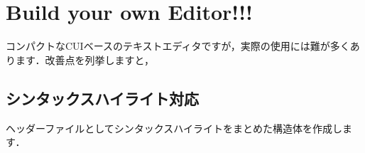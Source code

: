  \inputminted[frame=lines,framesep=2mm,baselinestretch=1.2,fontsize=\footnotesize,linenos,breaklines]{c}{takuzoo3868asset/struct.c}

 \inputminted[frame=lines,framesep=2mm,baselinestretch=1.2,fontsize=\footnotesize,linenos,breaklines]{c}{takuzoo3868asset/initEditor.c}

 \inputminted[frame=lines,framesep=2mm,baselinestretch=1.2,fontsize=\footnotesize,linenos,breaklines]{c}{takuzoo3868asset/editorSelectSyntaxHighlight.c}

 \inputminted[frame=lines,framesep=2mm,baselinestretch=1.2,fontsize=\footnotesize,linenos,breaklines]{c}{takuzoo3868asset/editorOpen.c}

 \inputminted[frame=lines,framesep=2mm,baselinestretch=1.2,fontsize=\footnotesize,linenos,breaklines]{c}{takuzoo3868asset/enableRawMode.c}

 \inputminted[frame=lines,framesep=2mm,baselinestretch=1.2,fontsize=\footnotesize,linenos,breaklines]{c}{takuzoo3868asset/enableRawMode.c}

\section{Build your own Editor!!!}
コンパクトなCUIベースのテキストエディタですが，実際の使用には難が多くあります．改善点を列挙しますと，

\subsection{シンタックスハイライト対応}
ヘッダーファイルとしてシンタックスハイライトをまとめた構造体を作成します．
